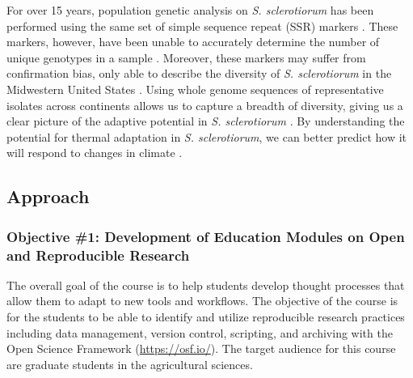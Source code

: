 \documentclass[12pt,letterpaper]{article}
\begin{document}
For over 15 years, population genetic analysis on \textit{S. sclerotiorum} has been performed using the same set of simple sequence repeat (SSR) markers \citep{sirjusingh2001characterization}. 
These markers, however, have been unable to accurately determine the number of unique genotypes in a sample \citep{lehner2017independently, lehner2017sclerotinia,arnaud2007standardizing}.
Moreover, these markers may suffer from confirmation bias, only able to describe the diversity of \textit{S. sclerotiorum} in the Midwestern United States \citep{attanayake2013sclerotinia}. 
Using whole genome sequences of representative isolates across continents allows us to capture a breadth of diversity, giving us a clear picture of the adaptive potential in \textit{S. sclerotiorum} \citep{grunwald2016population}.
By understanding the potential for thermal adaptation in \textit{S. sclerotiorum}, we can better predict how it will respond to changes in climate \citep{croll2016genetic}.


\subsection{Approach}


\subsubsection{Objective \#1: Development of Education Modules on Open and Reproducible Research}

The overall goal of the course is to help students develop thought processes that allow them to adapt to new tools and workflows. 
The objective of the course is for the students to be able to identify and utilize reproducible research practices including data management, version control, scripting, and archiving with the Open Science Framework (\url{https://osf.io/}).
The target audience for this course are graduate students in the agricultural sciences.
\end{document}
